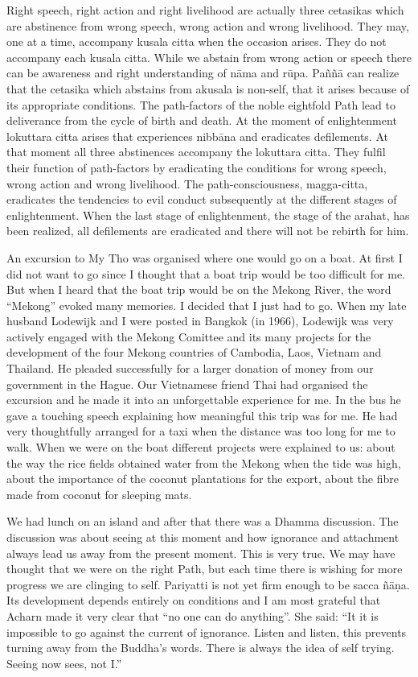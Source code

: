 {{{{Right speech, right action and right
livelihood are actually three cetasikas which are abstinence from wrong
speech, wrong action and wrong livelihood. They may, one at a time,
accompany kusala citta when the occasion arises. They do not accompany
each kusala citta. While we abstain from wrong action or speech there
can be awareness and right understanding of nāma and rūpa. Paññā can
realize that the cetasika which abstains from akusala is non-self, that
it arises because of its appropriate conditions. The path-factors of the
noble eightfold Path lead to deliverance from the cycle of birth and
death. At the moment of enlightenment lokuttara citta arises that
experiences nibbāna and eradicates defilements. At that moment all three
abstinences accompany the lokuttara citta. They fulfil their function of
path-factors by eradicating the conditions for wrong speech, wrong
action and wrong livelihood. The path-consciousness, magga-citta,
eradicates the tendencies to evil conduct subsequently at the different
stages of enlightenment. When the last stage of enlightenment, the stage
of the arahat, has been realized, all defilements are eradicated and
there will not be rebirth for him. 

An excursion to My Tho was organised
where one would go on a boat. At first I did not want to go since I
thought that a boat trip would be too difficult for me. But when I heard
that the boat trip would be on the Mekong River, the word ``Mekong''
evoked many memories. I decided that I just had to go. When my late
husband Lodewijk and I were posted in Bangkok (in 1966), Lodewijk was
very actively engaged with the Mekong Comittee and its many projects for
the development of the four Mekong countries of Cambodia, Laos, Vietnam
and Thailand. He pleaded successfully for a larger donation of money
from our government in the Hague. Our Vietnamese friend Thai had
organised the excursion and he made it into an unforgettable experience
for me. In the bus he gave a touching speech explaining how meaningful
this trip was for me. He had very thoughtfully arranged for a taxi when
the distance was too long for me to walk. When we were on the boat
different projects were explained to us: about the way the rice fields
obtained water from the Mekong when the tide was high, about the
importance of the coconut plantations for the export, about the fibre
made from coconut for sleeping mats.

We had lunch on an island and after
that there was a Dhamma discussion. The discussion was about seeing at
this moment and how ignorance and attachment always lead us away from
the present moment. This is very true. We may have thought that we were
on the right Path, but each time there is wishing for more progress we
are clinging to self. Pariyatti is not yet firm enough to be sacca ñāṇa.
Its development depends entirely on conditions and I am most grateful
that Acharn made it very clear that ``no one can do anything''. She
said: ``It it is impossible to go against the current of ignorance.
Listen and listen, this prevents turning away from the Buddha's words.
There is always the idea of self trying. Seeing now sees, not I.'' 




}}}}
